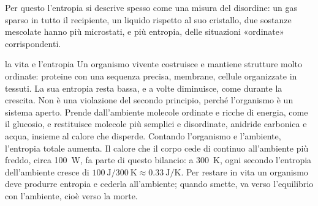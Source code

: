 Per questo l'entropia si descrive spesso come una misura del disordine: un gas sparso in tutto il recipiente, un liquido rispetto al suo cristallo, due sostanze mescolate hanno più microstati, e più entropia, delle situazioni «ordinate» corrispondenti.

\begin{applicazione}{la vita e l'entropia}
Un organismo vivente costruisce e mantiene strutture molto ordinate: proteine con una sequenza precisa, membrane, cellule organizzate in tessuti. La sua entropia resta bassa, e a volte diminuisce, come durante la crescita. Non è una violazione del secondo principio, perché l'organismo è un sistema aperto. Prende dall'ambiente molecole ordinate e ricche di energia, come il glucosio, e restituisce molecole più semplici e disordinate, anidride carbonica e acqua, insieme al calore che disperde. Contando l'organismo e l'ambiente, l'entropia totale aumenta. Il calore che il corpo cede di continuo all'ambiente più freddo, circa \SI{100}{\watt}, fa parte di questo bilancio: a \SI{300}{\kelvin}, ogni secondo l'entropia dell'ambiente cresce di $\SI{100}{\joule} / \SI{300}{\kelvin} \approx \SI{0,33}{\joule\per\kelvin}$. Per restare in vita un organismo deve produrre entropia e cederla all'ambiente; quando smette, va verso l'equilibrio con l'ambiente, cioè verso la morte.
\end{applicazione}

\riepilogoformule
